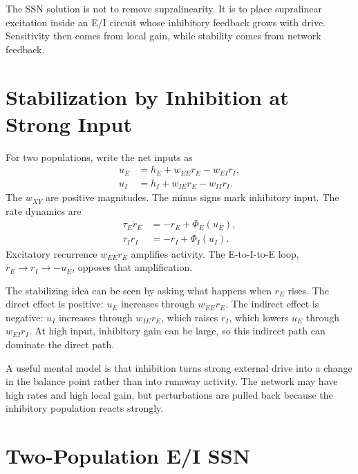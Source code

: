 The SSN solution is not to remove supralinearity. It is to place supralinear excitation inside an E/I circuit whose inhibitory feedback grows with drive. Sensitivity then comes from local gain, while stability comes from network feedback.

\section{Stabilization by Inhibition at Strong Input}
\label{sec:stabilization-by-inhibition-strong-input}

For two populations, write the net inputs as
%
\begin{align}
  u_E
  &=
  h_E+w_{EE}r_E-w_{EI}r_I,
  \label{eq:ssn-e-input}\\
  u_I
  &=
  h_I+w_{IE}r_E-w_{II}r_I.
  \label{eq:ssn-i-input}
\end{align}
%
The $w_{XY}$ are positive magnitudes. The minus signs mark inhibitory input. The rate dynamics are
%
\begin{align}
  \tau_E\dot r_E
  &=
  -r_E+\Phi_E(u_E),
  \label{eq:ssn-e-rate}\\
  \tau_I\dot r_I
  &=
  -r_I+\Phi_I(u_I).
  \label{eq:ssn-i-rate}
\end{align}
%
Excitatory recurrence $w_{EE}r_E$ amplifies activity. The E-to-I-to-E loop, $r_E \to r_I \to -u_E$, opposes that amplification.

The stabilizing idea can be seen by asking what happens when $r_E$ rises. The direct effect is positive: $u_E$ increases through $w_{EE}r_E$. The indirect effect is negative: $u_I$ increases through $w_{IE}r_E$, which raises $r_I$, which lowers $u_E$ through $w_{EI}r_I$. At high input, inhibitory gain can be large, so this indirect path can dominate the direct path.

A useful mental model is that inhibition turns strong external drive into a change in the balance point rather than into runaway activity. The network may have high rates and high local gain, but perturbations are pulled back because the inhibitory population reacts strongly.

\section{Two-Population E/I SSN}
\label{sec:two-population-ei-ssn}

